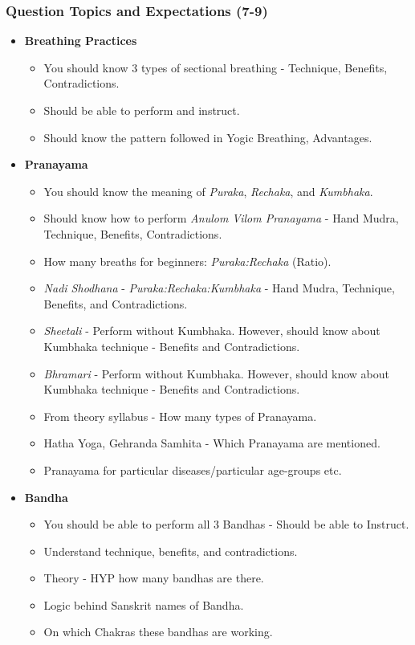 \begin{frame}[fragile]\frametitle{Question Topics and Expectations (7-9)}
    \begin{itemize}
        \item \textbf{Breathing Practices}
        \begin{itemize}
            \item You should know 3 types of sectional breathing - Technique, Benefits, Contradictions.
            \item Should be able to perform and instruct.
            \item Should know the pattern followed in Yogic Breathing, Advantages.
        \end{itemize}	
        \item \textbf{Pranayama}
        \begin{itemize}
            \item You should know the meaning of \textit{Puraka}, \textit{Rechaka}, and \textit{Kumbhaka}.
            \item Should know how to perform \textit{Anulom Vilom Pranayama} - Hand Mudra, Technique, Benefits, Contradictions.
            \item How many breaths for beginners: \textit{Puraka:Rechaka} (Ratio).
            \item \textit{Nadi Shodhana} - \textit{Puraka:Rechaka:Kumbhaka} - Hand Mudra, Technique, Benefits, and Contradictions.
            \item \textit{Sheetali} - Perform without Kumbhaka. However, should know about Kumbhaka technique - Benefits and Contradictions.
            \item \textit{Bhramari} - Perform without Kumbhaka. However, should know about Kumbhaka technique - Benefits and Contradictions.
            \item From theory syllabus - How many types of Pranayama.
            \item Hatha Yoga, Gehranda Samhita - Which Pranayama are mentioned.
            \item Pranayama for particular diseases/particular age-groups etc.
        \end{itemize}
        \item \textbf{Bandha}
        \begin{itemize}
            \item You should be able to perform all 3 Bandhas - Should be able to Instruct.
            \item Understand technique, benefits, and contradictions.
            \item Theory - HYP how many bandhas are there.
            \item Logic behind Sanskrit names of Bandha.
            \item On which Chakras these bandhas are working.
        \end{itemize}
    \end{itemize}
\end{frame}


